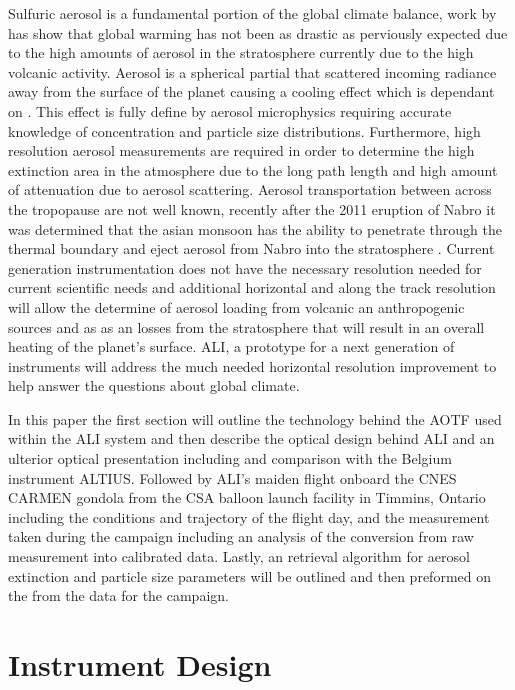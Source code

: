 \documentclass[12pt]{article}
\begin{document}
Sulfuric aerosol is a fundamental portion of the global climate balance, work by \cite{Andreae2005} has show that global warming has not been as drastic as perviously expected due to the high amounts of aerosol in the stratosphere currently due to the high volcanic activity. Aerosol is a spherical partial that scattered incoming radiance away from the surface of the planet causing a cooling effect which is dependant on \citep{Kiehl1993}. This effect is fully define by aerosol microphysics requiring accurate knowledge of concentration and particle size distributions. Furthermore, high resolution aerosol measurements are required in order to determine the high extinction area in the atmosphere due to the long path length and high amount of attenuation due to aerosol scattering. Aerosol transportation between across the tropopause are not well known, recently after the 2011 eruption of Nabro it was determined that the asian monsoon has the ability to penetrate through the thermal boundary and eject aerosol from Nabro into the stratosphere \citep{Bourassa2012c}. Current generation instrumentation does not have the necessary resolution needed for current scientific needs and additional horizontal and along the track resolution will allow the determine of aerosol loading from volcanic an anthropogenic sources and as as an losses from the stratosphere that will result in an overall heating of the planet's surface. ALI, a prototype for a next generation of instruments will address the much needed horizontal resolution improvement to help answer the questions about global climate.

In this paper the first section will outline the technology behind the AOTF used within the ALI system and then describe the optical design behind ALI and an ulterior optical presentation including and comparison with the Belgium instrument ALTIUS. Followed by ALI's maiden flight onboard the CNES CARMEN gondola from the CSA balloon launch facility in Timmins, Ontario including the conditions and trajectory of the flight day, and the measurement taken during the campaign including an analysis of the conversion from raw measurement into calibrated data. Lastly, an retrieval algorithm for aerosol extinction and particle size parameters will be outlined and then preformed on the from the data for the campaign.

\section{Instrument Design}
\end{document}
